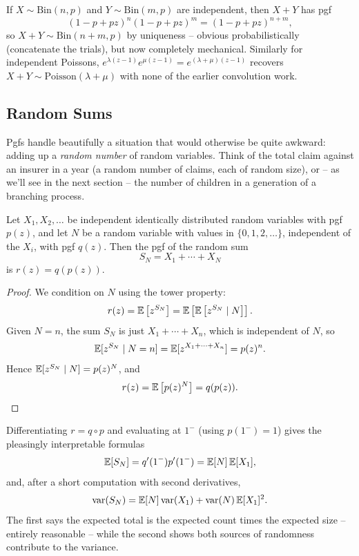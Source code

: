 \documentclass[a4paper]{scrartcl}
\begin{document}
\begin{example}
	If $X \sim \mathrm{Bin}(n, p)$ and $Y \sim \mathrm{Bin}(m, p)$ are independent, then $X + Y$ has pgf
	$$
	(1 - p + pz)^n (1 - p + pz)^m = (1 - p + pz)^{n + m},
	$$
	so $X + Y \sim \mathrm{Bin}(n + m, p)$ by uniqueness -- obvious probabilistically (concatenate the trials), but now completely mechanical. Similarly for independent Poissons, $e^{\lambda(z-1)}e^{\mu(z-1)} = e^{(\lambda + \mu)(z-1)}$ recovers $X + Y \sim \mathrm{Poisson}(\lambda + \mu)$ with none of the earlier convolution work.
\end{example}

\subsection{Random Sums}

Pgfs handle beautifully a situation that would otherwise be quite awkward: adding up a \emph{random number} of random variables. Think of the total claim against an insurer in a year (a random number of claims, each of random size), or -- as we'll see in the next section -- the number of children in a generation of a branching process.

\begin{theorem}
	Let $X_1, X_2, \dots$ be independent identically distributed random variables with pgf $p(z)$, and let $N$ be a random variable with values in $\{0, 1, 2, \dots\}$, independent of the $X_i$, with pgf $q(z)$. Then the pgf of the random sum
	$$
	S_N = X_1 + \cdots + X_N
	$$
	is $r(z) = q(p(z))$.
\end{theorem}
\begin{proof}
	We condition on $N$ using the tower property:
	$$
	r(z) = \mathbb{E}\left[z^{S_N}\right] = \mathbb{E}\left[\mathbb{E}\left[z^{S_N} \mid N\right]\right].
	$$
	Given $N = n$, the sum $S_N$ is just $X_1 + \cdots + X_n$, which is independent of $N$, so
	$$
	\mathbb{E}[z^{S_N} \mid N = n] = \mathbb{E}[z^{X_1 + \cdots + X_n}] = p(z)^n.
	$$
	Hence $\mathbb{E}[z^{S_N} \mid N] = p(z)^N$, and
	$$
	r(z) = \mathbb{E}\left[p(z)^N\right] = q(p(z)). \qedhere
	$$
\end{proof}

Differentiating $r = q \circ p$ and evaluating at $1^-$ (using $p(1^-) = 1$) gives the pleasingly interpretable formulas
$$
\mathbb{E}[S_N] = q'(1^-)p'(1^-) = \mathbb{E}[N]\,\mathbb{E}[X_1],
$$
and, after a short computation with second derivatives,
$$
\operatorname{var}(S_N) = \mathbb{E}[N]\operatorname{var}(X_1) + \operatorname{var}(N)\,\mathbb{E}[X_1]^2.
$$
The first says the expected total is the expected count times the expected size -- entirely reasonable -- while the second shows both sources of randomness contribute to the variance.
\end{document}
